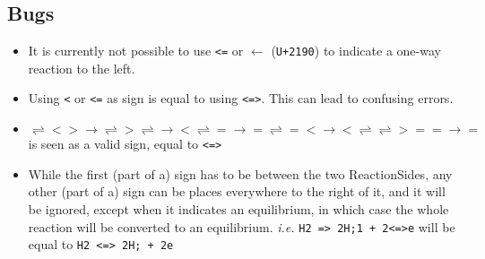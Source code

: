 \documentclass[11pt]{article}
\def\code#1{\texttt{#1}}
\def\equi{\rightleftharpoons}
\def\rar{\rightarrow}
\begin{document}
\subsection{Bugs}
\begin{itemize}
  \item{It is currently not possible to use \code{<=} or $\leftarrow$ (\code{U+2190}) to indicate a one-way reaction to the left.}
  \item{Using \code{<} or \code{<=} as sign is equal to using \code{<=>}. This can lead to confusing errors.}
  \item{\code{$\equi<>\rar\equi>\equi\rar<\equi=\rar=\equi=<\rar<\equi\equi>==\rar=$} is seen as a valid sign, equal to \code{<=>}}
  \item{While the first (part of a) sign has to be between the two ReactionSides, any other (part of a) sign can be places everywhere to the right of it, and it will be ignored, except when it indicates an equilibrium, in which case the whole reaction will be converted to an equilibrium. \textit{i.e.} \code{H2 => 2H;1 + 2<=>e} will be equal to \code{H2 <=> 2H; + 2e}}
\end{itemize}
\end{document}
